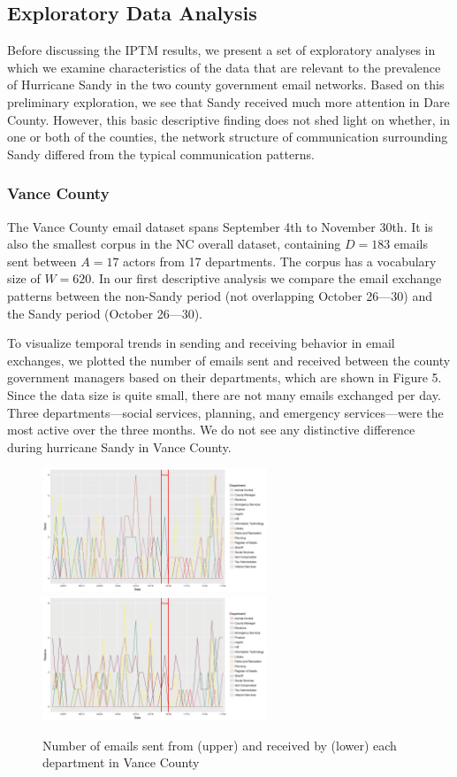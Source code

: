 \documentclass[a4paper]{article}
\begin{document}
 \subsection{Exploratory Data Analysis} \label{subsec: EDA}
 
Before discussing the IPTM results, we present a set of exploratory analyses in which we examine characteristics of the data that are relevant to the prevalence of Hurricane Sandy in the two county government email networks. Based on this preliminary exploration, we see that Sandy received much more attention in Dare County. However, this basic descriptive finding does not shed light on whether, in one or both of the counties, the network structure of communication surrounding Sandy differed from the typical communication patterns. 
 
 \subsubsection{Vance County}\label{subsubsec:VanceEDA} 
The Vance County email dataset spans September 4th to November 30th. It is also the smallest corpus in the NC overall dataset, containing $D=183$ emails sent between $A=17$ actors from 17 departments. The corpus has a vocabulary size of $W=620$.  In our first descriptive analysis we compare the email exchange patterns between the non-Sandy period (not overlapping October 26---30) and the Sandy period (October 26---30). 
 
 To visualize temporal trends in sending and receiving behavior in email exchanges, we plotted the number of emails sent and received between the county government managers based on their departments, which are shown in Figure 5. Since the data size is quite small, there are not many emails exchanged per day.  Three departments---social services, planning, and emergency services---were the most active over the three months. We do not see any distinctive difference during hurricane Sandy in Vance County.
  \begin{figure}[H]
  	\centering
  	  	\includegraphics[width=0.6\textwidth]{plots/VanceSend-1.png} 
  	  	\includegraphics[width=0.6\textwidth]{plots/VanceReceive-1.png} 
  	\label{fig:SendReceiveVance}
  	\caption{Number of emails sent from (upper) and received by (lower) each department in Vance County}
  \end{figure}
  
\end{document}

